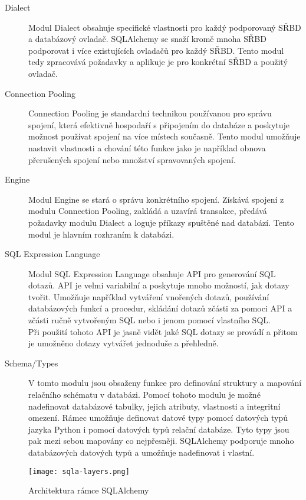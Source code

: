 \documentclass[ing,male,java,dept456]{diploma}						%
\begin{document}
\begin{description}
\item[Dialect] Modul Dialect obsahuje specifické vlastnosti pro každý podporovaný SŘBD a databázový ovladač. SQLAlchemy se snaží kromě mnoha SŘBD podporovat i více existujících ovladačů pro každý SŘBD. Tento modul tedy zpracovává požadavky a aplikuje je pro konkrétní SŘBD a použitý ovladač.
\item[Connection Pooling] Connection Pooling je standardní technikou používanou pro správu spojení, která efektivně hospodaří s připojením do databáze a poskytuje možnost používat spojení na více místech současně. Tento modul umožňuje nastavit vlastnosti a chování této funkce jako je například obnova přerušených spojení nebo množství spravovaných spojení.
\item[Engine] Modul Engine se stará o správu konkrétního spojení. Získává spojení z modulu Connection Pooling, zakládá a uzavírá transakce, předává požadavky modulu Dialect a loguje příkazy spuštěné nad databází. Tento modul je hlavním rozhraním k databázi.
\item[SQL Expression Language] Modul SQL Expression Language obsahuje API pro generování SQL dotazů. API je velmi variabilní a poskytuje mnoho možností, jak dotazy tvořit. Umožňuje například vytváření vnořených dotazů, používání databázových funkcí a procedur, skládání dotazů zčásti za pomoci API a zčásti ručně vytvořeným SQL nebo i jenom pomocí vlastního SQL. \\
Při použití tohoto API je jasně vidět jaké SQL dotazy se provádí a přitom je umožněno dotazy vytvářet jednoduše a přehledně.
\item[Schema/Types] V tomto modulu jsou obsaženy funkce pro definování struktury a mapování relačního schématu v databázi. Pomocí tohoto modulu je možné nadefinovat databázové tabulky, jejich atributy, vlastnosti a integritní omezení. Rámec umožňuje definovat datové typy pomocí datových typů jazyka Python i pomocí datových typů relační databáze. Tyto typy jsou pak mezi sebou mapovány co nejpřesněji. SQLAlchemy podporuje mnoho databázových datových typů a umožňuje nadefinovat i vlastní.
\end{description}

\begin{figure}[h!]
    \centering
    \texttt{[image: sqla-layers.png]}
    \caption{Architektura rámce SQLAlchemy \cite[str. 3]{sqla-doc}}
    \label{fig:sqla-layers}
\end{figure}
\end{document}
